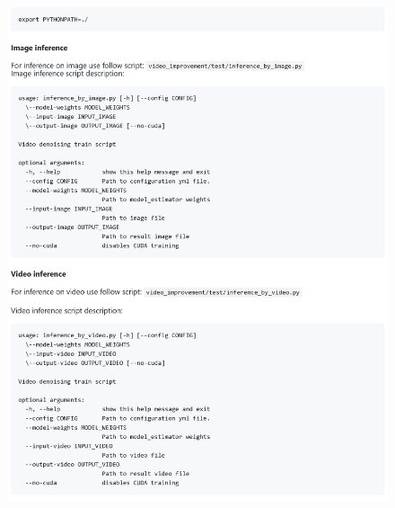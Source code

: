 \begin{figure}[h]
	\centering
	\includegraphics[width=\textwidth]{img/markdown/README_4}
	\label{fig:markdown_4}
\end{figure}


\printbibliography[%
    heading=bibintoc%
]





